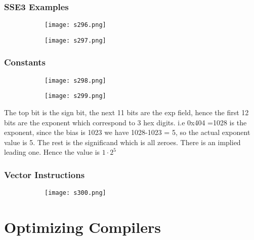 \documentclass[8pt]{extreport}
\begin{document}
\subsection{SSE3 Examples}
\begin{figure}[H]
\centering
\begin{subfigure}[b]{0.4\linewidth}
\texttt{[image: s296.png]}
\end{subfigure}
\begin{subfigure}[b]{0.4\linewidth}
\texttt{[image: s297.png]}
\end{subfigure}
\end{figure}

\subsection{Constants}
\begin{figure}[H]
\centering
\begin{subfigure}[b]{0.4\linewidth}
\texttt{[image: s298.png]}
\end{subfigure}
\begin{subfigure}[b]{0.4\linewidth}
\texttt{[image: s299.png]}
\end{subfigure}
\end{figure}
The top bit is the sign bit, the next 11 bits are the exp field, hence the first 12 bits are the exponent which correspond to 3 hex digits. i.e 0x404 =1028 is the exponent, since the bias is 1023 we have 1028-1023 = 5, so the actual exponent value is 5. The rest is the significand which is all zeroes. There is an implied leading one. Hence the value is $1 \cdot 2^5$

\subsection{Vector Instructions}
\begin{figure}[H]
\centering
\begin{subfigure}[b]{0.4\linewidth}
\texttt{[image: s300.png]}
\end{subfigure}
\end{figure}

\chapter{Optimizing Compilers}
\end{document}
